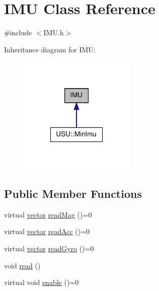\hypertarget{class_i_m_u}{\section{\-I\-M\-U \-Class \-Reference}
\label{class_i_m_u}
}


{\ttfamily \#include $<$\-I\-M\-U.\-h$>$}



\-Inheritance diagram for \-I\-M\-U\-:
\nopagebreak
\begin{figure}[H]
\begin{center}
\leavevmode
\includegraphics[width=156pt]{class_i_m_u__inherit__graph}
\end{center}
\end{figure}
\subsection*{\-Public \-Member \-Functions}
\begin{DoxyCompactItemize}
\item 
virtual \hyperlink{vector_8h_a148efcf3c5319dd8961dbf9f4b846a98}{vector} \hyperlink{class_i_m_u_a52359006a1ca04d0b1852f374a476f91}{read\-Mag} ()=0
\item 
virtual \hyperlink{vector_8h_a148efcf3c5319dd8961dbf9f4b846a98}{vector} \hyperlink{class_i_m_u_a2928cc8a1fc13464ef90da96fd9358b7}{read\-Acc} ()=0
\item 
virtual \hyperlink{vector_8h_a148efcf3c5319dd8961dbf9f4b846a98}{vector} \hyperlink{class_i_m_u_a887a00b7e1c998a65ee42b021b59d84c}{read\-Gyro} ()=0
\item 
void \hyperlink{class_i_m_u_a1de4cb31f28f71d7cc8b1546ea59b4ab}{read} ()
\item 
virtual void \hyperlink{class_i_m_u_a58899f2357a00a4d1f3b892b879e1e92}{enable} ()=0
\end{DoxyCompactItemize}
